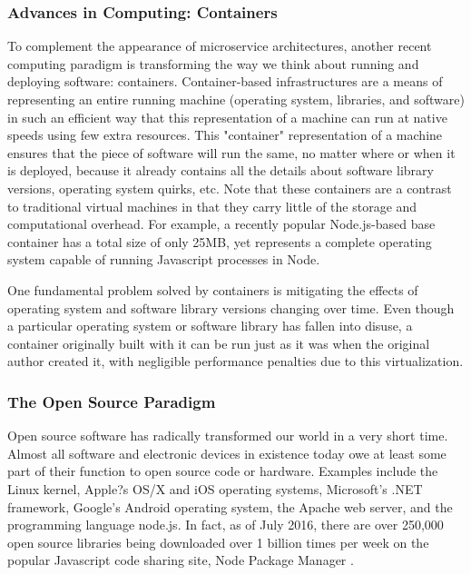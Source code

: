 \documentclass[11pt]{article}
\begin{document}
\subsubsection{Advances in Computing: Containers}   

To complement the appearance of microservice architectures, another recent computing paradigm is transforming the way we think 
about running and deploying software: containers.  Container-based infrastructures are a means of representing an entire running 
machine (operating system, libraries, and software) in such an efficient way that this representation of a machine can run at native speeds 
using few extra resources.  This "container" representation of a machine ensures that the piece of software will run the same, no matter 
where or when it is deployed, because it already contains all the details about software library versions, operating system quirks, etc.   
Note that these containers are a contrast to traditional virtual machines in that they carry little of the storage and computational overhead.  
For example, a recently popular Node.js-based base container \cite{Reeder:16} has a total size of only 25MB, yet represents a complete 
operating system capable of running Javascript processes in Node.

One fundamental problem solved by containers is mitigating the effects of operating system and software library versions changing over time.   
Even though a particular operating system or software library has fallen into disuse, a container originally built with it can be run 
just as it was when the original author created it, with negligible performance penalties due to this virtualization.  

\subsubsection{The Open Source Paradigm}   

Open source software has radically transformed our world in a very short time.  Almost all software and electronic devices in 
existence today owe at least some part of their function to open source code or hardware.  Examples include the Linux kernel, 
Apple?s OS/X and iOS operating systems, Microsoft's .NET framework, Google's Android operating system, the Apache web server, 
and the programming language node.js.  In fact, as of July 2016, there are over 250,000 open source libraries being downloaded over 
1 billion times per week on the popular Javascript code sharing site, Node Package Manager \cite{NPM:16}.
\end{document}
